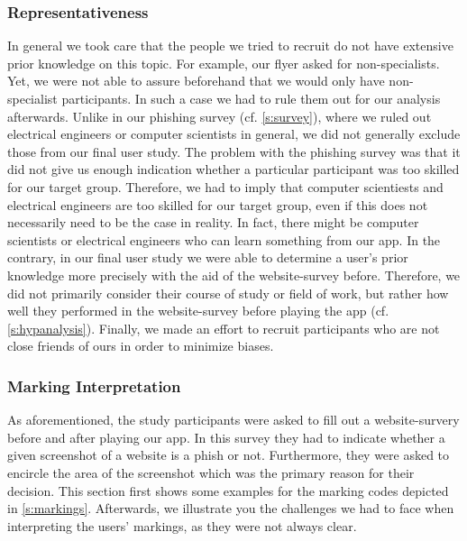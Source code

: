 \subsubsection{Representativeness}
\label{s:representativeness}
In general we took care that the people we tried to recruit do not have extensive prior knowledge on this topic.
For example, our flyer asked for non-specialists.
Yet, we were not able to assure beforehand that we would only have non-specialist participants.
In such a case we had to rule them out for our analysis afterwards.
Unlike in our phishing survey (cf. \autoref{s:survey}), where we ruled out electrical engineers or computer scientists in general, we did not generally exclude those from our final user study.
The problem with the phishing survey was that it did not give us enough indication whether a particular participant was too skilled for our target group.
Therefore, we had to imply that computer scientiests and electrical engineers are too skilled for our target group, even if this does not necessarily need to be the case in reality.
In fact, there might be computer scientists or electrical engineers who can learn something from our app.
In the contrary, in our final user study we were able to determine a user's prior knowledge more precisely with the aid of the website-survey before.
Therefore, we did not primarily consider their course of study or field of work, but rather how well they performed in the website-survey before playing the app (cf. \autoref{s:hypanalysis}).
Finally, we made an effort to recruit participants who are not close friends of ours in order to minimize biases.

\subsubsection{Marking Interpretation}
\label{s:intprobs}

As aforementioned, the study participants were asked to fill out a website-survery before and after playing our app.
In this survey they had to indicate whether a given screenshot of a website is a phish or not.
Furthermore, they were asked to encircle the area of the screenshot which was the primary reason for their decision.
This section first shows some examples for the marking codes depicted in \autoref{s:markings}.
Afterwards, we illustrate you the challenges we had to face when interpreting the users' markings, as they were not always clear.

